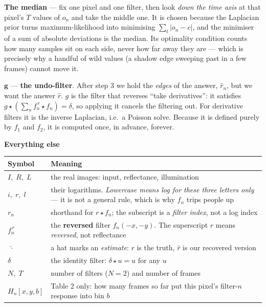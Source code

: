 \documentclass[11pt]{article}
\newcommand{\step}[1]{\smallskip\par\noindent\textbf{\textcolor{amber}{#1}}\par\nobreak}
\begin{document}
\medskip
\noindent\textbf{The median} --- fix one pixel and one filter, then look \emph{down the time axis} at that
pixel's $T$ values of $o_n$ and take the middle one. It is chosen because the Laplacian prior turns
maximum-likelihood into minimising $\sum_t |o_n - c|$, and the minimiser of a sum of absolute deviations is the
median. Its optimality condition counts how many samples sit on each side, never how far away they are ---
which is precisely why a handful of wild values (a shadow edge sweeping past in a few frames) cannot move it.

\medskip
\noindent$\boldsymbol{g}$ --- \textbf{the undo-filter}. After step 3 we hold the \emph{edges} of the answer,
$\hat r_n$, but we want the answer $\hat r$. $g$ is the filter that reverses ``take derivatives'': it satisfies
$g \star (\sum_n f^{\,r}_n \star f_n) = \delta$, so applying it cancels the filtering out. For derivative
filters it is the inverse Laplacian, i.e.\ a Poisson solve. Because it is defined purely by $f_1$ and $f_2$, it
is computed once, in advance, forever.

\step{Everything else}

\noindent\begin{tabular}{@{}l L{13.2cm}@{}}
\toprule
\textbf{Symbol} & \textbf{Meaning} \\
\midrule
$I,\;R,\;L$   & the real images: input, reflectance, illumination \\
$i,\;r,\;l$   & their logarithms. \emph{Lowercase means log for these three letters only} --- it is not a
                general rule, which is why $f_n$ trips people up \\
$r_n$         & shorthand for $r \star f_n$; the subscript is a \emph{filter index}, not a log index \\
$f^{\,r}_n$   & the \textbf{reversed} filter $f_n(-x,-y)$. The superscript $r$ means \emph{reversed}, not
                reflectance \\
$\;\hat{\cdot}\;$ & a hat marks an \emph{estimate}: $r$ is the truth, $\hat r$ is our recovered version \\
$\delta$      & the identity filter: $\delta \star u = u$ for any $u$ \\
$N,\;T$       & number of filters ($N=2$) and number of frames \\
$H_n[x,y,b]$  & Table 2 only: how many frames so far put this pixel's filter-$n$ response into bin $b$ \\
\bottomrule
\end{tabular}
\end{document}
